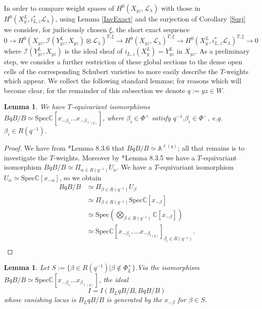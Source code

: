 \documentclass[12pt,reqno]{amsart}
\newtheorem{lemma}[theorem]{Lemma}
\theoremstyle{definition}
\begin{document}
In order to compare weight spaces of $H^0(X_{yz}, \mathscr{L}_{\lambda})$ with those in $H^0(X^L_{y}, i^*_{L,z} \mathscr{L}_{\lambda})$, using Lemma \ref{InvExact} and the surjection of Corollary \ref{Surj} we consider, for judiciously chosen $\xi$, the short exact sequence 
$$
0 \to H^0(X_{yz}, \mathscr{I}(Y^L_{yz}, X_{yz})\otimes \mathscr{L}_\lambda)^{T, \xi} \to H^0(X_{yz}, \mathscr{L}_\lambda)^{T, \xi} \to H^0(X^L_{y}, i^*_{L,z}\mathscr{L}_\lambda)^{T,\xi} \to 0
$$
where $\mathscr{I}(Y^L_{yz}, X_{yz})$ is the ideal sheaf of $i_{L,z}(X^L_y) = Y^L_{yz}$ in $X_{yz}$. As a preliminary step, we consider a further restriction of these global sections to the dense open cells of the corresponding Schubert varieties to more easily describe the $T$-weights which appear. We collect the following standard lemmas; for reasons which will become clear, for the remainder of this subsection we denote $q:=yz \in W$. 





\begin{lemma}\label{affinespace}
We have $T$-equivariant isomorphisms $BqB/B \simeq \mathrm{Spec} \mathbb{C}[x_{-\beta_1} \dots x_{-\beta_{\ell(q)}}]$, where $\beta_i \in \Phi^+$ satisfy $q^{-1}.\beta_i \in \Phi^{-}$, e.g. $\beta_i \in R(q^{-1}).$
\end{lemma}

\begin{proof}
We have from \cite{Springer}*{Lemma 8.3.6} that $BqB/B \simeq \mathbb{A}^{\ell(q)}$; all that remains is to investigate the $T$-weights. Moreover by \cite{Springer}*{Lemma 8.3.5} we have a $T$-equivariant isomorphism $BqB/B \simeq \Pi_{\alpha \in R(q^{-1})} U_{\alpha}$. We have a $T$-equivariant isomorphism $U_{\alpha} \simeq \mathrm{Spec} \mathbb{C}[x_{-\alpha}]$, so we obtain
\begin{align*}
 BqB/B  & \simeq \Pi_{\beta \in R(q^{-1})}U_{\beta} \\ 
 & \simeq \Pi_{\beta \in R(q^{-1})} \mathrm{Spec} \mathbb{C}[x_{-\beta}] \\ 
 &\simeq \mathrm{Spec}( \bigotimes_{\beta \in R(q^{-1})} \mathbb{C}[x_{-\beta}])\\ 
 & \simeq \mathrm{Spec} \mathbb{C}[x_{-\beta_1}, \dots x_{-\beta_{l(q)}}]_{\beta_i \in R(q^{-1})}. \\
\end{align*}
\end{proof}


\begin{lemma}
Let $S:= \{ \beta \in R(q^{-1})| \beta \notin \Phi^+_L\}$.Via the isomorphism $BqB/B \simeq \mathrm{Spec} \mathbb{C}[x_{-\beta_1} \dots x_{\beta_{\ell(q)}}]$, the ideal \[I=I(B_LqB/B, BqB/B)\] whose vanishing locus is $B_LqB/B$ is generated by the $x_{-\beta}$ for $\beta \in S$.
\end{lemma}
\end{document}
